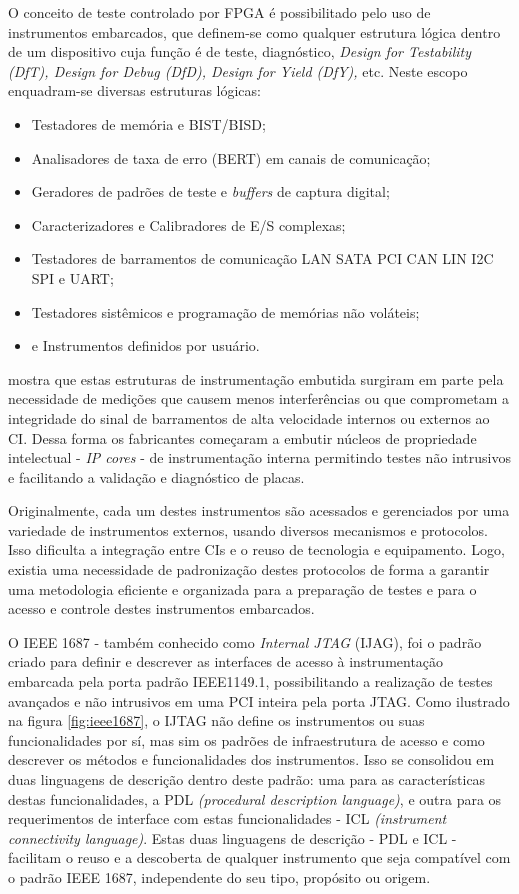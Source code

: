O conceito de teste controlado por FPGA é possibilitado pelo uso de instrumentos embarcados, que definem-se como qualquer estrutura lógica dentro de um dispositivo cuja função é de teste, diagnóstico, \textit{Design for Testability (DfT), Design for Debug  (DfD), Design for Yield (DfY),} etc. Neste escopo enquadram-se diversas estruturas lógicas:    
\begin{itemize}
    \item Testadores de memória e BIST/BISD;
    \item Analisadores de taxa de erro (BERT) em canais de comunicação;
    \item Geradores de padrões de teste e \textit{buffers} de captura digital;
    \item Caracterizadores e Calibradores de E/S complexas;
    \item Testadores de barramentos de comunicação LAN SATA PCI CAN LIN I2C SPI e UART;
    \item Testadores sistêmicos e programação de memórias não voláteis;
    \item e Instrumentos definidos por usuário.
\end{itemize}

\citet{Stollon2011} mostra que estas estruturas de instrumentação embutida surgiram em parte pela necessidade de medições que causem menos interferências ou que comprometam a integridade do sinal de barramentos de alta velocidade internos ou externos ao CI. Dessa forma os fabricantes começaram a embutir núcleos de propriedade intelectual - \textit{IP cores} - de instrumentação interna permitindo testes não intrusivos e facilitando a validação e diagnóstico de placas.

Originalmente, cada um destes instrumentos são acessados e gerenciados por uma variedade de instrumentos externos, usando diversos mecanismos e protocolos. Isso dificulta a integração entre CIs e o reuso de tecnologia e equipamento. Logo, existia uma necessidade de padronização destes protocolos de forma a garantir uma metodologia eficiente e organizada para a preparação de testes e para o acesso e controle destes instrumentos embarcados. 

O IEEE 1687 \citep{ieee1687}- também conhecido como \textit{Internal JTAG} (IJAG), foi o padrão criado para definir e descrever as interfaces de acesso à instrumentação embarcada pela porta padrão IEEE1149.1, possibilitando a realização de testes avançados e não intrusivos em uma PCI inteira pela porta JTAG. Como ilustrado na figura \ref{fig:ieee1687}, o IJTAG não define os instrumentos ou suas funcionalidades por sí, mas sim os padrões de infraestrutura de acesso e como descrever os métodos e funcionalidades dos instrumentos. Isso se consolidou em duas linguagens de descrição dentro deste padrão: uma para as características destas funcionalidades, a PDL \textit{(procedural description language)}, e outra para os requerimentos de interface com estas funcionalidades - ICL \textit{(instrument connectivity language)}. Estas duas linguagens de descrição - PDL e ICL - facilitam o reuso e a descoberta de qualquer instrumento que seja compatível com o padrão IEEE 1687, independente do seu tipo, propósito ou origem. 

